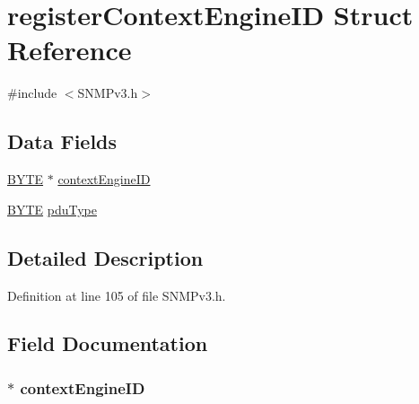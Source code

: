 \hypertarget{structregister_context_engine_i_d}{}\section{register\+Context\+Engine\+I\+D Struct Reference}
\label{structregister_context_engine_i_d}


{\ttfamily \#include $<$S\+N\+M\+Pv3.\+h$>$}

\subsection*{Data Fields}
\begin{DoxyCompactItemize}
\item 
\hyperlink{_generic_type_defs_8h_a4ae1dab0fb4b072a66584546209e7d58}{B\+Y\+T\+E} $\ast$ \hyperlink{structregister_context_engine_i_d_aa75baf2d001f5d5ac415eed279fd6e85}{context\+Engine\+I\+D}
\item 
\hyperlink{_generic_type_defs_8h_a4ae1dab0fb4b072a66584546209e7d58}{B\+Y\+T\+E} \hyperlink{structregister_context_engine_i_d_ad106adfabb3dc56cdc2d52727d9771c5}{pdu\+Type}
\end{DoxyCompactItemize}


\subsection{Detailed Description}


Definition at line 105 of file S\+N\+M\+Pv3.\+h.



\subsection{Field Documentation}
\hypertarget{structregister_context_engine_i_d_aa75baf2d001f5d5ac415eed279fd6e85}{}
\subsubsection[{context\+Engine\+I\+D}]{$\ast$ context\+Engine\+I\+D}\label{structregister_context_engine_i_d_aa75baf2d001f5d5ac415eed279fd6e85}


